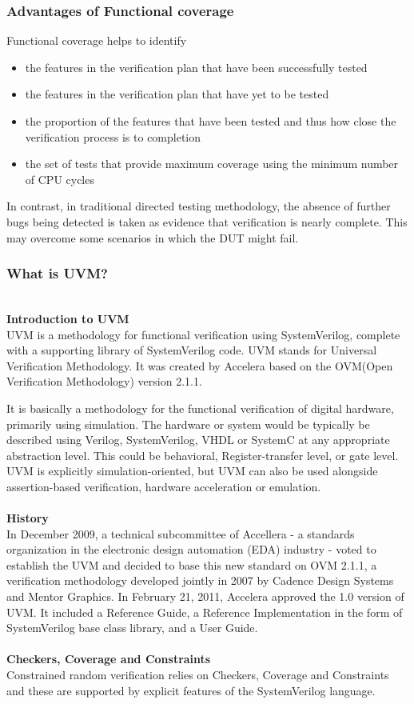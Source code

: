 \documentclass[a4paper,11pt]{article}
\begin{document}
\subsubsection{Advantages of Functional coverage}
Functional coverage helps to identify

\begin{itemize}[noitemsep]
\item the features in the verification plan that have been successfully tested
\item the features in the verification plan that have yet to be tested
\item the proportion of the features that have been tested and thus how close the verification process is to completion
\item the set of tests that provide maximum coverage using the minimum number of CPU cycles
\end{itemize}

In contrast, in traditional directed testing methodology, the absence of further bugs being detected is taken as evidence that verification is nearly complete. This may overcome some scenarios in which the DUT might fail.

\subsubsection{What is UVM?}
\ \\ 
\textbf{Introduction to UVM}
\ \\
UVM is a methodology for functional verification using SystemVerilog, complete with a supporting library of SystemVerilog code. UVM stands for Universal Verification Methodology. It was created by Accelera based on the OVM(Open Verification Methodology) version 2.1.1.

It is basically a methodology for the functional verification of digital hardware, primarily using simulation. The hardware or system would be typically be described using Verilog, SystemVerilog, VHDL or SystemC at any appropriate abstraction level. This could be behavioral, Register-transfer level, or gate level. UVM is explicitly simulation-oriented, but UVM can also be used alongside assertion-based verification, hardware acceleration or emulation.
\ \\
\ \\
\textbf{History}
\ \\
In December 2009, a technical subcommittee of Accellera - a standards organization in the electronic design automation (EDA) industry - voted to establish the UVM and decided to base this new standard on OVM 2.1.1, a verification methodology developed jointly in 2007 by Cadence Design Systems and Mentor Graphics.
In February 21, 2011, Accelera approved the 1.0 version of UVM. It included a Reference Guide, a Reference Implementation in the form of SystemVerilog base class library, and a User Guide.
\ \\
\ \\
\textbf{Checkers, Coverage and Constraints}
\ \\
Constrained random verification relies on Checkers, Coverage and Constraints and these are supported by explicit features of the SystemVerilog language.
\end{document}
